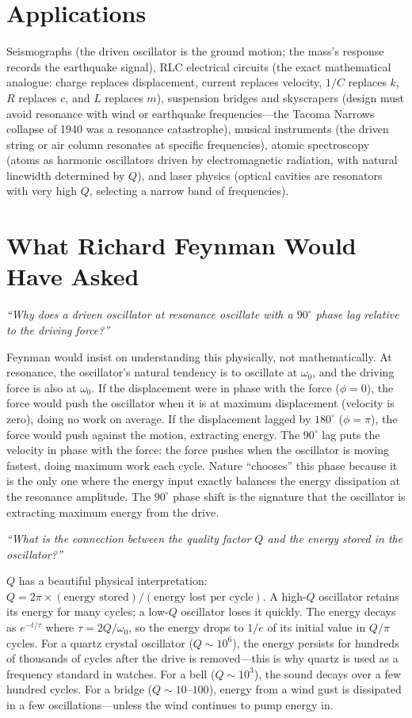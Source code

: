\section*{Applications}

Seismographs (the driven oscillator is the ground motion; the mass's response records the earthquake signal), RLC electrical circuits (the exact mathematical analogue: charge replaces displacement, current replaces velocity, $1/C$ replaces $k$, $R$ replaces $c$, and $L$ replaces $m$), suspension bridges and skyscrapers (design must avoid resonance with wind or earthquake frequencies---the Tacoma Narrows collapse of 1940 was a resonance catastrophe), musical instruments (the driven string or air column resonates at specific frequencies), atomic spectroscopy (atoms as harmonic oscillators driven by electromagnetic radiation, with natural linewidth determined by $Q$), and laser physics (optical cavities are resonators with very high $Q$, selecting a narrow band of frequencies).
\section*{What Richard Feynman Would Have Asked}

\textit{``Why does a driven oscillator at resonance oscillate with a $90^\circ$ phase lag relative to the driving force?''}

Feynman would insist on understanding this physically, not mathematically. At resonance, the oscillator's natural tendency is to oscillate at $\omega_0$, and the driving force is also at $\omega_0$. If the displacement were in phase with the force ($\phi = 0$), the force would push the oscillator when it is at maximum displacement (velocity is zero), doing no work on average. If the displacement lagged by $180^\circ$ ($\phi = \pi$), the force would push against the motion, extracting energy. The $90^\circ$ lag puts the velocity in phase with the force: the force pushes when the oscillator is moving fastest, doing maximum work each cycle. Nature ``chooses'' this phase because it is the only one where the energy input exactly balances the energy dissipation at the resonance amplitude. The $90^\circ$ phase shift is the signature that the oscillator is extracting maximum energy from the drive.

\textit{``What is the connection between the quality factor $Q$ and the energy stored in the oscillator?''}

$Q$ has a beautiful physical interpretation: $Q = 2\pi \times (\text{energy stored})/(\text{energy lost per cycle})$. A high-$Q$ oscillator retains its energy for many cycles; a low-$Q$ oscillator loses it quickly. The energy decays as $e^{-t/\tau}$ where $\tau = 2Q/\omega_0$, so the energy drops to $1/e$ of its initial value in $Q/\pi$ cycles. For a quartz crystal oscillator ($Q \sim 10^6$), the energy persists for hundreds of thousands of cycles after the drive is removed---this is why quartz is used as a frequency standard in watches. For a bell ($Q \sim 10^3$), the sound decays over a few hundred cycles. For a bridge ($Q \sim 10$--$100$), energy from a wind gust is dissipated in a few oscillations---unless the wind continues to pump energy in.

